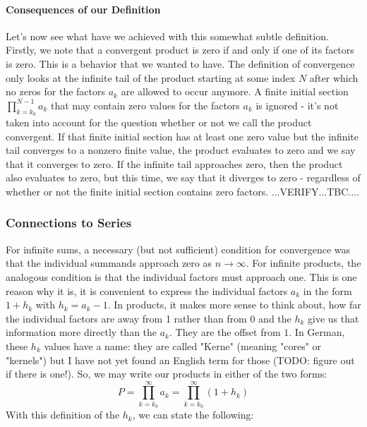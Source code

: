 \paragraph{Consequences of our Definition}
Let's now see what have we achieved with this somewhat subtle definition. Firstly, we note that a convergent product is zero if and only if one of its factors is zero. This is a behavior that we wanted to have. The definition of convergence only looks at the infinite tail of the product starting at some index $N$ after which no zeros for the factors $a_k$ are allowed to occur anymore. A finite initial section $\prod_{k=k_0}^{N-1} a_k$ that may contain zero values for the factors $a_k$ is ignored - it's not taken into account for the question whether or not we call the product convergent. If that finite initial section has at least one zero value but the infinite tail converges to a nonzero finite value, the product evaluates to zero and we say that it converges to zero. If the infinite tail approaches zero, then the product also evaluates to zero, but this time, we say that it diverges to zero - regardless of whether or not the finite initial section contains zero factors. ...VERIFY...TBC....




\subsubsection{Connections to Series}
For infinite sums, a necessary (but not sufficient) condition for convergence was that the individual summands approach zero as $n \rightarrow \infty$. For infinite products, the analogous condition is that the individual factors must approach one. This is one reason why it is, it is convenient to express the individual factors $a_k$ in the form $1 + h_k$ with $h_k = a_k - 1$. In products, it makes more sense to think about, how far the individual factors are away from 1 rather than from 0 and the $h_k$ give us that information more directly than the $a_k$. They are the offset from $1$. In German, these $h_k$ values have a name: they are called "Kerne" (meaning "cores" or "kernels") but I have not yet found an English term for those (TODO: figure out if there is one!). So, we may write our products in either of the two forms:
\begin{equation}
 P = \prod_{k=k_0}^{\infty} a_k = \prod_{k=k_0}^{\infty} (1 + h_k) 
\end{equation}
With this definition of the $h_k$, we can state the following:

